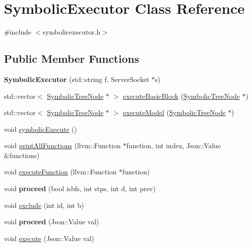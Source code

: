 \hypertarget{classSymbolicExecutor}{}\section{Symbolic\+Executor Class Reference}
\label{classSymbolicExecutor}


{\ttfamily \#include $<$symbolicexecutor.\+h$>$}

\subsection*{Public Member Functions}
\begin{DoxyCompactItemize}
\item 
{\bfseries Symbolic\+Executor} (std\+::string f, Server\+Socket $\ast$s)\hypertarget{classSymbolicExecutor_a8c0bcb3e67fc547f3efdbb522fc4dfb6}{}\label{classSymbolicExecutor_a8c0bcb3e67fc547f3efdbb522fc4dfb6}

\item 
std\+::vector$<$ \hyperlink{classSymbolicTreeNode}{Symbolic\+Tree\+Node} $\ast$ $>$ \hyperlink{classSymbolicExecutor_a8638f95d2e833b456bfa8c7b8eb62d74}{execute\+Basic\+Block} (\hyperlink{classSymbolicTreeNode}{Symbolic\+Tree\+Node} $\ast$)
\item 
std\+::vector$<$ \hyperlink{classSymbolicTreeNode}{Symbolic\+Tree\+Node} $\ast$ $>$ \hyperlink{classSymbolicExecutor_a26e6644c25e0a732e2550287626a0f8f}{execute\+Model} (\hyperlink{classSymbolicTreeNode}{Symbolic\+Tree\+Node} $\ast$)
\item 
void \hyperlink{classSymbolicExecutor_a004c981bad23ebd7492f30140c9df37c}{symbolic\+Execute} ()
\item 
void \hyperlink{classSymbolicExecutor_ad62f357c9bd1c315264fe607721d6355}{print\+All\+Functions} (llvm\+::\+Function $\ast$function, int index, Json\+::\+Value \&functions)
\item 
void \hyperlink{classSymbolicExecutor_a313557a080e87cd2a9db2ef3c889e8de}{execute\+Function} (llvm\+::\+Function $\ast$function)
\item 
void {\bfseries proceed} (bool isbfs, int stps, int d, int prev)\hypertarget{classSymbolicExecutor_a8cc66a79dd50429531dda1f0c06faa0f}{}\label{classSymbolicExecutor_a8cc66a79dd50429531dda1f0c06faa0f}

\item 
void \hyperlink{classSymbolicExecutor_a43133fd58f4f28ea791cab3d1b09bb3f}{exclude} (int id, int b)
\item 
void {\bfseries proceed} (Json\+::\+Value val)\hypertarget{classSymbolicExecutor_ad76931ff50100eb3ec6f3f53f81155fe}{}\label{classSymbolicExecutor_ad76931ff50100eb3ec6f3f53f81155fe}

\item 
void \hyperlink{classSymbolicExecutor_a730b136a1b89fe9ec688f72e40b52a7a}{execute} (Json\+::\+Value val)
\end{DoxyCompactItemize}


